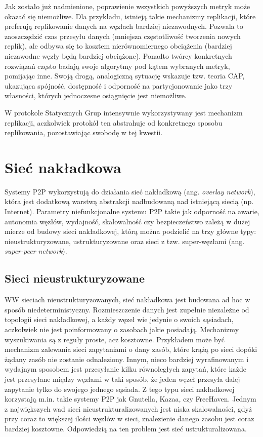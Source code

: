 \documentclass[12pt, twoside, openany]{report}
\begin{document}
Jak zostało już nadmienione, poprawienie wszystkich powyższych metryk może okazać się niemożliwe. Dla przykładu, istnieją takie mechanizmy replikacji, które preferują replikowanie danych na węzłach bardziej niezawodnych. Pozwala to zaoszczędzić czas przesyłu danych (mniejsza częstotliwość tworzenia nowych replik), ale odbywa się to kosztem nierównomiernego obciążenia (bardziej niezawodne węzły będą bardziej obciążone). Ponadto twórcy konkretnych rozwiązań często badają swoje algorytmy pod kątem wybranych metryk, pomijając inne. Swoją drogą, analogiczną sytuację wskazuje tzw. teoria CAP, ukazująca spójność, dostępność i odporność na partycjonowanie jako trzy własności, których jednoczesne osiągnięcie jest niemożliwe.

W protokole Statycznych Grup intensywnie wykorzystywany jest mechanizm replikacji, aczkolwiek protokół ten abstrahuje od konkretnego sposobu replikowania, pozostawiając swobodę w tej kwestii.


\section{Sieć nakładkowa}
Systemy P2P wykorzystują do działania sieć nakładkową (ang. \textit{overlay network}), która jest dodatkową warstwą abstrakcji nadbudowaną nad istniejącą siecią (np. Internet). Parametry niefunkcjonalne systemu P2P takie jak odporność na awarie, autonomia węzłów, wydajność, skalowalność czy bezpieczeństwo zależą w dużej mierze od budowy sieci nakładkowej, którą można podzielić na trzy główne typy: nieustrukturyzowane, ustrukturyzowane oraz sieci z tzw. super-węzłami (ang. \textit{super-peer network}).

\subsection{Sieci nieustrukturyzowane}
\label{paragraf_sieci_ustrukturyzowane}
WW sieciach nieustrukturyzowanych, sieć nakładkowa jest budowana ad hoc w sposób niedeterministyczny. Rozmieszczenie danych jest zupełnie niezależne od topologii sieci nakładkowej, a każdy węzeł wie jedynie o swoich sąsiadach, aczkolwiek nie jest poinformowany o zasobach jakie posiadają. Mechanizmy wyszukiwania są z reguły proste, acz kosztowne. Przykładem może być mechanizm zalewania sieci zapytaniami o dany zasób, które krążą po sieci dopóki żądany zasób nie zostanie odnaleziony. Innym, nieco bardziej wyrafinowanym i wydajnym sposobem jest przesyłanie kilku równoległych zapytań, które każde jest przesyłane między węzłami w taki sposób, że jeden węzeł przesyła dalej zapytanie tylko do swojego jednego sąsiada. Z tego typu sieci nakładkowej korzystają m.in. takie systemy P2P jak Gnutella, Kazaa, czy FreeHaven. Jednym z największych wad sieci nieustrukturalizowanych jest niska skalowalności, gdyż przy coraz to większej ilości węzłów w sieci, znalezienie danego zasobu jest coraz bardziej kosztowne. Odpowiedzią na ten problem jest sieć ustrukturalizowana.
\end{document}
